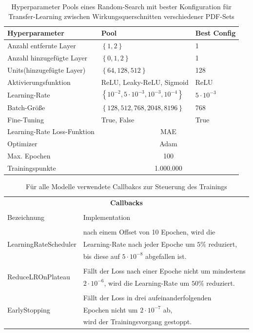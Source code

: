 \begin{table}
	\centering
	\begin{tabular}{|l|l|l|}
		\hline
		Hyperparameter & Pool & Best Config \\
		\hline
		Anzahl entfernte Layer & $\left\lbrace  1, 2 \right\rbrace $ & 1 \\
		Anzahl hinzugefügte Layer & $\left\lbrace  0, 1, 2 \right\rbrace $ & 1 \\
		Units(hinzugefügte Layer) &$\left\lbrace 64, 128, 512\right\rbrace$ & 128\\
		Aktivierungsfunktion & ReLU, Leaky-ReLU, Sigmoid & ReLU \\
		Learning-Rate & $\left\lbrace 10^{-2}, 5 \cdot 10^{-3}, 10^{-3}, 10^{-4} \right\rbrace $ & $5 \cdot 10^{-3}$\\
		Batch-Größe & $\left\lbrace 128, 512, 768, 2048, 8196 \right\rbrace $ & 768\\
		Fine-Tuning & True, False & True \\
		\hline
		Learning-Rate
		Loss-Funktion & \multicolumn{2}{c|}{MAE} \\
		Optimizer & \multicolumn{2}{c|}{Adam} \\
		Max. Epochen & \multicolumn{2}{c|}{100}\\
		Trainingspunkte & \multicolumn{2}{c|}{1.000.000} \\
		\hline
	\end{tabular}
	\caption{Hyperparameter Pools eines Random-Search mit bester Konfiguration für Transfer-Learning zwischen Wirkungsquerschnitten verschiedener PDF-Sets}
	\label{hyperparameter-transfer}
\end{table}
\begin{table}
	\centering
	\begin{tabular}{ll}
		\multicolumn{2}{c}{\textbf{Callbacks}} \\
		&\\
		Bezeichnung & Implementation\\
		\hline\\[-5pt]
		\multirow{3}{*}{LearningRateScheduler} & nach einem Offset von 10 Epochen, wird die \\
		& Learning-Rate nach jeder Epoche um $5\%$ reduziert, \\
		& bis diese auf $5 \cdot 10^{-8}$ abgefallen ist. \\
		&\\
		\multirow{2}{*}{ReduceLROnPlateau}& Fällt der Loss nach einer Epoche nicht um mindestens\\
		& $2 \cdot 10^{-6}$, wird die Learning-Rate um $50\%$ reduziert.\\
		&\\
		\multirow{3}{*}{EarlyStopping}& Fällt der Loss in drei aufeinanderfolgenden \\
		& Epochen nicht um $2 \cdot 10^{-7}$ ab, \\
		& wird der Trainingsvorgang gestoppt.\\[5pt]
	\end{tabular}
	\caption{Für alle Modelle verwendete Callbakcs zur Steuerung des Trainings}
	\label{callbacks}
\end{table}
